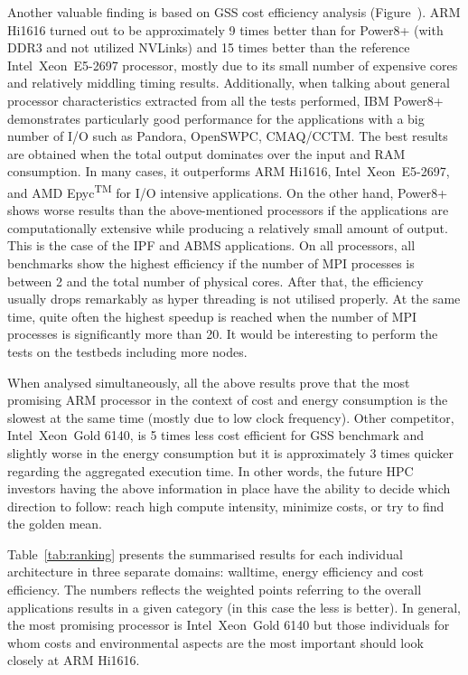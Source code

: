 Another valuable finding is based on GSS cost efficiency analysis (Figure~). ARM Hi1616 turned out to be approximately 9 times better than for Power8+ (with DDR3 and not utilized NVLinks) and 15 times better than the reference Intel\textregistered\ Xeon\textregistered\ E5-2697 processor, mostly due to its small number of expensive cores and relatively middling timing results.
Additionally, when talking about general processor characteristics extracted from all the tests performed, IBM Power8+ demonstrates particularly good performance for the applications with a big number of I/O such as Pandora, OpenSWPC, CMAQ/CCTM. The best results are obtained when the total output dominates over the input and RAM consumption. In many cases, it outperforms ARM Hi1616, Intel\textregistered\ Xeon\textregistered\ E5-2697, and AMD Epyc\textsuperscript{TM} for I/O intensive applications. On the other hand, Power8+ shows worse results than the above-mentioned processors if the applications are computationally extensive while producing a relatively small amount of output. This is the case of the IPF and ABMS applications. On all processors, all benchmarks show the highest efficiency if the number of MPI processes is between 2 and the total number of physical cores. After that, the efficiency usually drops remarkably as hyper threading is not utilised properly. At the same time, quite often the highest speedup is reached when the number of MPI processes is significantly more than 20. It would be interesting to perform the tests on the testbeds including more nodes. 



When analysed simultaneously, all the above results prove that the most promising ARM processor in the context of cost and energy consumption is the slowest at the same time (mostly due to low clock frequency). Other competitor, Intel\textregistered\ Xeon\textregistered\ Gold 6140, is 5 times less cost efficient for GSS benchmark and slightly worse in the energy consumption but it is approximately 3 times quicker regarding the aggregated execution time. In other words, the future HPC investors having the above information in place have the ability to decide which direction to follow: reach high compute intensity, minimize costs, or try to find the golden mean.

Table~\ref{tab:ranking} presents the summarised results for each individual architecture in three separate domains: walltime, energy efficiency and cost efficiency. The numbers reflects the weighted points referring to the overall applications results in a given category (in this case the less is better). In general, the most promising processor is Intel\textregistered\ Xeon\textregistered\ Gold 6140 but those individuals for whom costs and environmental aspects are the most important should look closely at ARM Hi1616.
    
